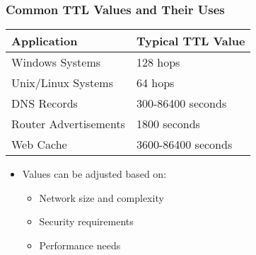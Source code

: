 \documentclass{beamer}
\begin{document}
\begin{frame}
    \frametitle{Common TTL Values and Their Uses}
    
    \begin{tabular}{|p{}|p{}|}
        \hline
        \textbf{Application} & \textbf{Typical TTL Value} \\
        \hline
        Windows Systems & 128 hops \\
        \hline
        Unix/Linux Systems & 64 hops \\
        \hline
        DNS Records & 300-86400 seconds \\
        \hline
        Router Advertisements & 1800 seconds \\
        \hline
        Web Cache & 3600-86400 seconds \\
        \hline
    \end{tabular}
    
    \begin{itemize}
        \item Values can be adjusted based on:
        \begin{itemize}
            \item Network size and complexity
            \item Security requirements
            \item Performance needs
        \end{itemize}
    \end{itemize}
\end{frame}
\end{document}
